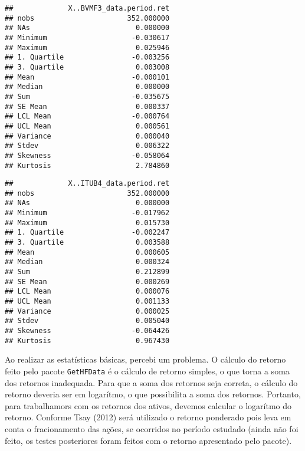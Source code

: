 \documentclass[]{article}
\newenvironment{Shaded}{\begin{snugshade}}{\end{snugshade}}
\newcommand{\KeywordTok}[1]{\textcolor[rgb]{0.13,0.29,0.53}{\textbf{{#1}}}}
\newcommand{\NormalTok}[1]{{#1}}
\begin{document}
\begin{verbatim}
##             X..BVMF3_data.period.ret
## nobs                      352.000000
## NAs                         0.000000
## Minimum                    -0.030617
## Maximum                     0.025946
## 1. Quartile                -0.003256
## 3. Quartile                 0.003008
## Mean                       -0.000101
## Median                      0.000000
## Sum                        -0.035675
## SE Mean                     0.000337
## LCL Mean                   -0.000764
## UCL Mean                    0.000561
## Variance                    0.000040
## Stdev                       0.006322
## Skewness                   -0.058064
## Kurtosis                    2.784860
\end{verbatim}

\begin{Shaded}
\end{Shaded}

\begin{verbatim}
##             X..ITUB4_data.period.ret
## nobs                      352.000000
## NAs                         0.000000
## Minimum                    -0.017962
## Maximum                     0.015730
## 1. Quartile                -0.002247
## 3. Quartile                 0.003588
## Mean                        0.000605
## Median                      0.000324
## Sum                         0.212899
## SE Mean                     0.000269
## LCL Mean                    0.000076
## UCL Mean                    0.001133
## Variance                    0.000025
## Stdev                       0.005040
## Skewness                   -0.064426
## Kurtosis                    0.967430
\end{verbatim}

Ao realizar as estatísticas básicas, percebi um problema. O cálculo do
retorno feito pelo pacote \texttt{GetHFData} é o cálculo de retorno
simples, o que torna a soma dos retornos inadequada. Para que a soma dos
retornos seja correta, o cálculo do retorno deveria ser em logarítmo, o
que possibilita a soma dos retornos. Portanto, para trabalhamors com os
retornos dos ativos, devemos calcular o logarítmo do retorno. Conforme
Tsay (2012) será utilizado o retorno ponderado pois leva em conta o
fracionamento das ações, se ocorridos no período estudado (ainda não foi
feito, os testes posteriores foram feitos com o retorno apresentado pelo
pacote).
\end{document}
